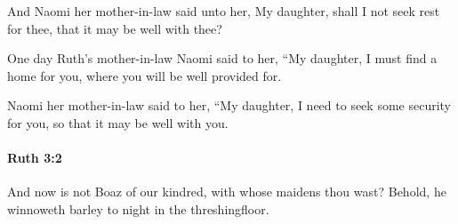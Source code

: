 			\begin{versebox}
					\item[BHS] 
					\item[LXX] 
					\item[ASV] And Naomi her mother-in-law said unto her, My daughter, shall I not seek rest for thee, that it may be well with thee?
					\item[NIV] One day Ruth’s mother-in-law Naomi said to her, “My daughter, I must find a home for you, where you will be well provided for.
					\item[NRSV] Naomi her mother-in-law said to her, “My daughter, I need to seek some security for you, so that it may be well with you.
			\end{versebox}

		\paragraph{Ruth 3:2} %
			\label{RUTH-3-2}

			And now is not Boaz of our kindred, with whose maidens thou wast? Behold, he winnoweth barley to night in the threshingfloor.

